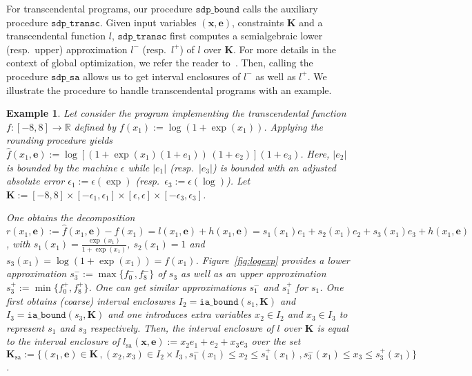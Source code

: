 \documentclass[preprint,fleqn,nocopyrightspace]{sigplanconf}
\newcommand{\R}{\mathbb{R}}
\newcommand{\x}{\mathbf{x}}
\newcommand{\e}{\mathbf{e}}
\def\K{\mathbf{K}}
\newcommand{\iaboundfun}[2]{\mathtt{ia\_bound}(#1, #2)}
\newcommand{\sdpbound}{\mathtt{sdp\_bound}}
\newcommand{\sa}{_\text{sa}}
\newcommand{\sdpsa}{\mathtt{sdp\_sa}}
\newcommand{\sdptransc}{\mathtt{sdp\_transc}}
\theoremstyle{plain}
\newtheorem{example}{Example}
\begin{document}
For transcendental programs, our procedure $\sdpbound$ calls the auxiliary procedure $\sdptransc$. Given input variables $(\x,\e)$, constraints $\K$ and a transcendental function $l$, $\sdptransc$ first computes a semialgebraic lower (resp.~upper)  approximation $l^-$ (resp.~$l^+$) of $l$ over $\K$. For more details in the context of global optimization, we refer the reader to~\cite{Magron15sdp}. Then, calling the procedure $\sdpsa$ allows us to get interval enclosures of $l^-$ as well as $l^+$.
We illustrate the procedure to handle transcendental programs with an example.
%
\begin{example}
\label{ex:logexp}
Let consider the program implementing the transcendental function $f : [-8, 8] \to \R$ defined by $f(x_1) := \log (1 + \exp(x_1))$. Applying the rounding procedure  yields $\hat{f}(x_1,\e) := \log [(1 + \exp(x_1) (1 + e_1)) \, (1 + e_2)](1 + e_3)$. 
Here, $|e_2|$ is bounded by the machine $\epsilon$ while $|e_1|$ (resp.~$|e_3|$) is bounded with an adjusted absolute error $\epsilon_1 := \epsilon(\exp)$ (resp.~$\epsilon_3 := \epsilon(\log)$).
Let $\K:= [-8,8] \times [-\epsilon_1, \epsilon_1] \times [\epsilon, \epsilon] \times [-\epsilon_3, \epsilon_3]$.

One obtains the decomposition $r(x_1, \e) := \hat{f}(x_1,\e) - f(x_1) = l(x_1,\e) + h(x_1,\e) = s_1 (x_1) e_1 + s_2 (x_1) e_2 + s_3 (x_1) e_3 + h(x_1, \e)$, with 
$s_1(x_1) = \frac{\exp(x_1)} {1 + \exp(x_1)}$, $s_2(x_1) = 1$ and $s_3(x_1) = \log (1 + \exp(x_1)) = f(x_1)$. Figure~\ref{fig:logexp} provides a lower approximation $s_3^- := \max\{f_0^-,f_8^-\}$ of $s_3$ as well as an upper approximation $s_3^+ := \min \{f_0^+,f_8^+\}$. One can get similar approximations $s_1^-$ and $s_1^+$ for $s_1$. 
%
One first obtains (coarse) interval enclosures $I_2 = \iaboundfun{s_1}{\K}$ and $I_3 = \iaboundfun{s_3}{\K}$ and one introduces extra variables $x_2 \in I_2$ and $x_3 \in I_3$ to represent $s_1$ and $s_3$ respectively.
Then, the interval enclosure of $l$ over $\K$ is equal to the interval enclosure of $l\sa(\x,\e) := x_2 e_1 + e_2 + x_3 e_3$ over the set $\K\sa:= \{(x_1,\e) \in \K \,, (x_2, x_3) \in I_2 \times I_3 \,, s_1^-(x_1) \leq x_2 \leq s_1^+(x_1) \,, s_3^-(x_1) \leq x_3 \leq s_3^+(x_1) \}$.
\end{example}
%
\end{document}
